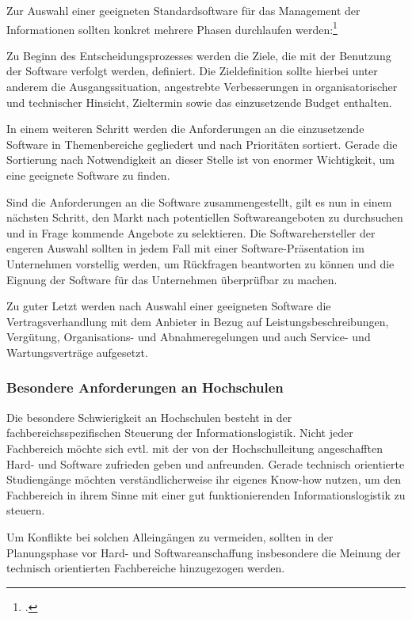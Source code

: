 Zur Auswahl einer geeigneten Standardsoftware für das Management der Informationen sollten konkret 
mehrere Phasen durchlaufen werden:\footcite{gronau_auswahl_2001}

Zu Beginn des Entscheidungsprozesses werden die Ziele, die mit der Benutzung der Software verfolgt werden, 
definiert. Die Zieldefinition sollte hierbei unter anderem die Ausgangssituation, angestrebte Verbesserungen 
in organisatorischer und technischer Hinsicht, Zieltermin sowie das einzusetzende Budget enthalten.

In einem weiteren Schritt werden die Anforderungen an die einzusetzende Software in Themenbereiche 
gegliedert und nach Prioritäten sortiert. Gerade die Sortierung nach Notwendigkeit an dieser Stelle ist 
von enormer Wichtigkeit, um eine geeignete Software zu finden.

Sind die Anforderungen an die Software zusammengestellt, gilt es nun in einem nächsten Schritt, 
den Markt nach potentiellen Softwareangeboten zu durchsuchen und in Frage kommende Angebote 
zu selektieren. Die Softwarehersteller der engeren Auswahl sollten in jedem Fall mit einer 
Software-Präsentation im Unternehmen vorstellig werden, um Rückfragen beantworten zu können 
und die Eignung der Software für das Unternehmen überprüfbar zu machen.

Zu guter Letzt werden nach Auswahl einer geeigneten Software die Vertragsverhandlung mit dem 
Anbieter in Bezug auf Leistungsbeschreibungen, Vergütung, Organisations- und Abnahmeregelungen 
und auch Service- und Wartungsverträge aufgesetzt. 

\subsubsection{Besondere Anforderungen an Hochschulen}
Die besondere Schwierigkeit an Hochschulen besteht in der fachbereichsspezifischen Steuerung der 
Informationslogistik. Nicht jeder Fachbereich möchte sich evtl. mit der von der Hochschulleitung 
angeschafften Hard- und Software zufrieden geben und anfreunden. Gerade technisch orientierte 
Studiengänge möchten verständlicherweise ihr eigenes Know-how nutzen, um den Fachbereich 
in ihrem Sinne mit einer gut funktionierenden Informationslogistik zu steuern.

Um Konflikte bei solchen \glqq Alleingängen\grqq{} zu vermeiden, sollten in der Planungsphase vor 
Hard- und Softwareanschaffung insbesondere die Meinung der technisch orientierten 
Fachbereiche hinzugezogen werden. 

